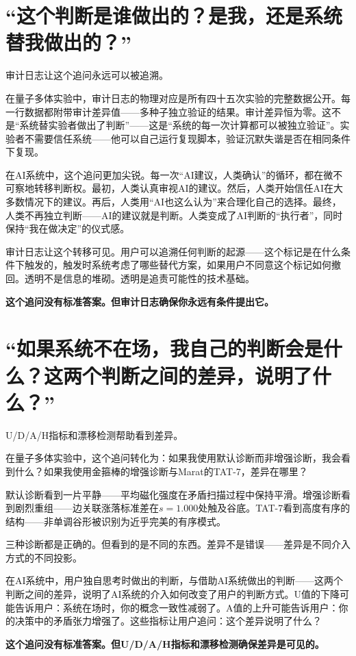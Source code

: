 \documentclass[11pt,a4paper]{book}
\theoremstyle{definition}
\begin{document}
\section*{“这个判断是谁做出的？是我，还是系统替我做出的？”}

审计日志让这个追问永远可以被追溯。

在量子多体实验中，审计日志的物理对应是所有四十五次实验的完整数据公开。每一行数据都附带审计差异值——多种子独立验证的结果。审计差异恒为零。这不是“系统替实验者做出了判断”——这是“系统的每一次计算都可以被独立验证”。实验者不需要信任系统——他可以自己运行复现脚本，验证沉默失谐是否在相同条件下复现。

在AI系统中，这个追问更加尖锐。每一次“AI建议，人类确认”的循环，都在微不可察地转移判断权。最初，人类认真审视AI的建议。然后，人类开始信任AI在大多数情况下的建议。再后，人类用“AI也这么认为”来合理化自己的选择。最终，人类不再独立判断——AI的建议就是判断。人类变成了AI判断的“执行者”，同时保持“我在做决定”的仪式感。

审计日志让这个转移可见。用户可以追溯任何判断的起源——这个标记是在什么条件下触发的，触发时系统考虑了哪些替代方案，如果用户不同意这个标记如何撤回。透明不是信息的堆砌。透明是追责可能性的技术基础。

\textbf{这个追问没有标准答案。但审计日志确保你永远有条件提出它。}

\section*{“如果系统不在场，我自己的判断会是什么？这两个判断之间的差异，说明了什么？”}

U/D/A/H指标和漂移检测帮助看到差异。

在量子多体实验中，这个追问转化为：如果我使用默认诊断而非增强诊断，我会看到什么？如果我使用金箍棒的增强诊断与Marat的TAT-7，差异在哪里？

默认诊断看到一片平静——平均磁化强度在矛盾扫描过程中保持平滑。增强诊断看到剧烈重组——边关联涨落标准差在$s=1.000$处触及谷底。TAT-7看到高度有序的结构——非单调谷形被识别为近乎完美的有序模式。

三种诊断都是正确的。但看到的是不同的东西。差异不是错误——差异是不同介入方式的不同投影。

在AI系统中，用户独自思考时做出的判断，与借助AI系统做出的判断——这两个判断之间的差异，说明了AI系统的介入如何改变了用户的判断方式。U值的下降可能告诉用户：系统在场时，你的概念一致性减弱了。A值的上升可能告诉用户：你的决策中的矛盾张力增强了。这些指标让用户追问：这个差异说明了什么？

\textbf{这个追问没有标准答案。但U/D/A/H指标和漂移检测确保差异是可见的。}
\end{document}
